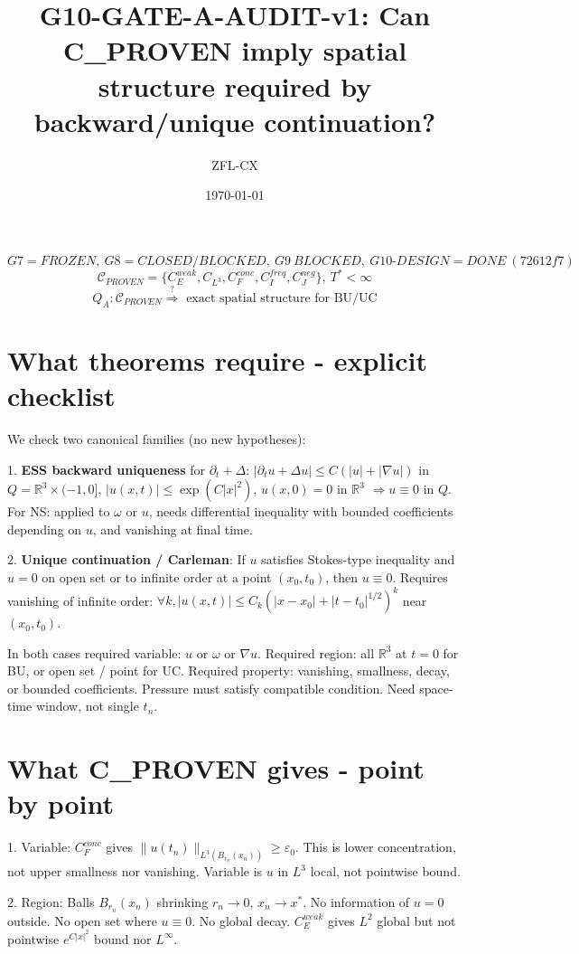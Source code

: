 \documentclass[11pt]{article}
\begin{document}
\title{G10-GATE-A-AUDIT-v1: Can C\_PROVEN imply spatial structure required by backward/unique continuation?}
\author{ZFL-CX}\date{\today}\maketitle

\[
\boxed{G7=FROZEN,\ G8=CLOSED/BLOCKED,\ G9\ BLOCKED,\ G10\text{-}DESIGN=DONE\ (72612f7)}
\]
\[
\boxed{\mathcal C_{PROVEN}=\{C_E^{weak},C_{L^3},C_F^{conc},C_I^{freq},C_J^{neg}\},\ T^*<\infty}
\]
\[
\boxed{Q_A:\mathcal C_{PROVEN}\stackrel{?}{\Rightarrow}\text{ exact spatial structure for BU/UC}}
\]

\section{What theorems require - explicit checklist}
We check two canonical families (no new hypotheses):

1. \textbf{ESS backward uniqueness} for $\partial_t+\Delta$:
$| \partial_t u+\Delta u|\le C(|u|+|\nabla u|)$ in $Q=\mathbb R^3\times(-1,0]$, $|u(x,t)|\le \exp(C|x|^2)$, $u(x,0)=0$ in $\mathbb R^3$ $\Rightarrow u\equiv0$ in $Q$. For NS: applied to $\omega$ or $u$, needs differential inequality with bounded coefficients depending on $u$, and vanishing at final time.

2. \textbf{Unique continuation / Carleman}: If $u$ satisfies Stokes-type inequality and $u=0$ on open set or to infinite order at a point $(x_0,t_0)$, then $u\equiv0$. Requires vanishing of infinite order: $\forall k, |u(x,t)|\le C_k(|x-x_0|+|t-t_0|^{1/2})^k$ near $(x_0,t_0)$.

In both cases required variable: $u$ or $\omega$ or $\nabla u$.
Required region: all $\mathbb R^3$ at $t=0$ for BU, or open set / point for UC.
Required property: vanishing, smallness, decay, or bounded coefficients.
Pressure must satisfy compatible condition.
Need space-time window, not single $t_n$.

\section{What C\_PROVEN gives - point by point}
1. Variable: $C_F^{conc}$ gives $\|u(t_n)\|_{L^3(B_{r_n}(x_n))}\ge\varepsilon_0$. This is lower concentration, not upper smallness nor vanishing. Variable is $u$ in $L^3$ local, not pointwise bound.

2. Region: Balls $B_{r_n}(x_n)$ shrinking $r_n\to0$, $x_n\to x^*$. No information of $u=0$ outside. No open set where $u\equiv0$. No global decay. $C_E^{weak}$ gives $L^2$ global but not pointwise $e^{C|x|^2}$ bound nor $L^\infty$.
\end{document}
